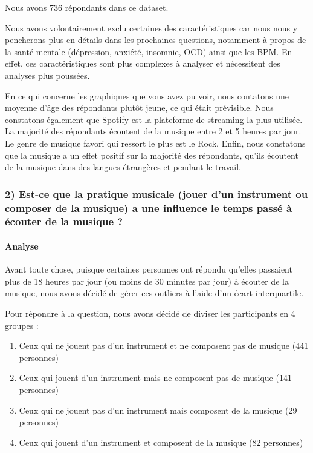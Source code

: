 \documentclass[
]{article}
\providecommand{\tightlist}{%
  \setlength{\itemsep}{0pt}\setlength{\parskip}{0pt}}
\begin{document}
Nous avons 736 répondants dans ce dataset.

Nous avons volontairement exclu certaines des caractéristiques car nous
nous y pencherons plus en détails dans les prochaines questions,
notamment à propos de la santé mentale (dépression, anxiété, insomnie,
OCD) ainsi que les BPM. En effet, ces caractéristiques sont plus
complexes à analyser et nécessitent des analyses plus poussées.

En ce qui concerne les graphiques que vous avez pu voir, nous contatons
une moyenne d'âge des répondants plutôt jeune, ce qui était prévisible.
Nous constatons également que Spotify est la plateforme de streaming la
plus utilisée. La majorité des répondants écoutent de la musique entre 2
et 5 heures par jour. Le genre de musique favori qui ressort le plus est
le Rock. Enfin, nous constatons que la musique a un effet positif sur la
majorité des répondants, qu'ils écoutent de la musique dans des langues
étrangères et pendant le travail.

\subsubsection{2) Est-ce que la pratique musicale (jouer d'un instrument
ou composer de la musique) a une influence le temps passé à écouter de
la musique
?}\label{est-ce-que-la-pratique-musicale-jouer-dun-instrument-ou-composer-de-la-musique-a-une-influence-le-temps-passuxe9-uxe0-uxe9couter-de-la-musique}

\paragraph{\texorpdfstring{\textbf{Analyse}}{Analyse}}\label{analyse-2}

Avant toute chose, puisque certaines personnes ont répondu qu'elles
passaient plus de 18 heures par jour (ou moins de 30 minutes par jour) à
écouter de la musique, nous avons décidé de gérer ces outliers à l'aide
d'un écart interquartile.

Pour répondre à la question, nous avons décidé de diviser les
participants en 4 groupes :

\begin{enumerate}
\def\labelenumi{\arabic{enumi}.}
\tightlist
\item
  Ceux qui ne jouent pas d'un instrument et ne composent pas de musique
  (441 personnes)
\item
  Ceux qui jouent d'un instrument mais ne composent pas de musique (141
  personnes)
\item
  Ceux qui ne jouent pas d'un instrument mais composent de la musique
  (29 personnes)
\item
  Ceux qui jouent d'un instrument et composent de la musique (82
  personnes)
\end{enumerate}
\end{document}
